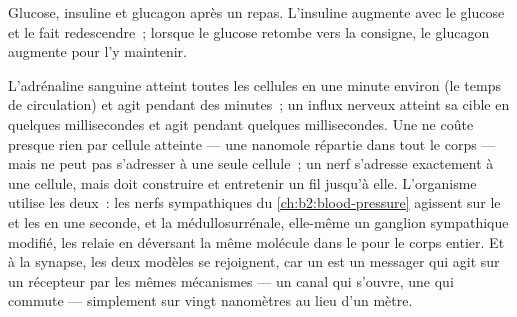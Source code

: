 \begin{omfigure}

{\small Glucose, insuline et glucagon après un repas. L'insuline augmente
avec le glucose et le fait redescendre~; lorsque le glucose retombe vers
la consigne, le glucagon augmente pour l'y maintenir.}
\end{omfigure}

\begin{example}\label{ex:b2:cell-signalling:compare}
L'adrénaline sanguine atteint toutes les cellules en une minute environ
(le temps de circulation) et agit pendant des minutes~; un influx
nerveux atteint sa cible en quelques millisecondes et agit pendant
quelques millisecondes. Une  ne coûte presque rien par cellule
atteinte --- une nanomole répartie dans tout le corps --- mais ne peut pas
s'adresser à une seule cellule~; un nerf s'adresse exactement à une
cellule, mais doit construire et entretenir un fil jusqu'à elle.
L'organisme utilise les deux~: les nerfs sympathiques du
\cref{ch:b2:blood-pressure} agissent sur le  et les  en une
seconde, et la médullosurrénale, elle-même un ganglion sympathique
modifié, les relaie en déversant la même molécule dans le  pour le
corps entier. Et à la synapse, les deux modèles se rejoignent, car un
 est un messager qui agit sur un récepteur par les
mêmes mécanismes --- un canal qui s'ouvre, une  qui commute ---
simplement sur vingt nanomètres au lieu d'un mètre.
\end{example}

